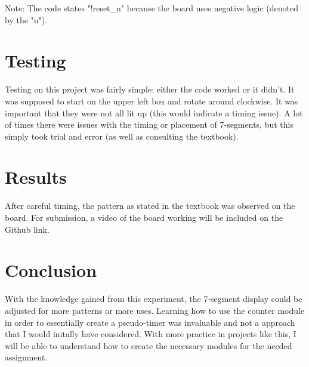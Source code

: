 \documentclass[11pt]{article}
\begin{document}
Note: The code states "!reset\_n" because the board uses negative logic (denoted by the "n"). 

\section*{Testing}

Testing on this project was fairly simple: either the code worked or it didn't. It was supposed to start on the upper left box and rotate around clockwise. It was important that they were not all lit up (this would indicate a timing issue). A lot of times there were issues with the timing or placement of 7-segments, but this simply took trial and error (as well as consulting the textbook). 

\section*{Results}

After careful timing, the pattern as stated in the textbook was observed on the board. For submission, a video of the board working will be included on the Github link. 

\section*{Conclusion}

With the knowledge gained from this experiment, the 7-segment display could be adjusted for more patterns or more uses. Learning how to use the counter module in order to essentially create a pseudo-timer was invaluable and not a approach that I would initally have considered. With more practice in projects like this, I will be able to understand how to create the necessary modules for the needed assignment. 
\end{document}
